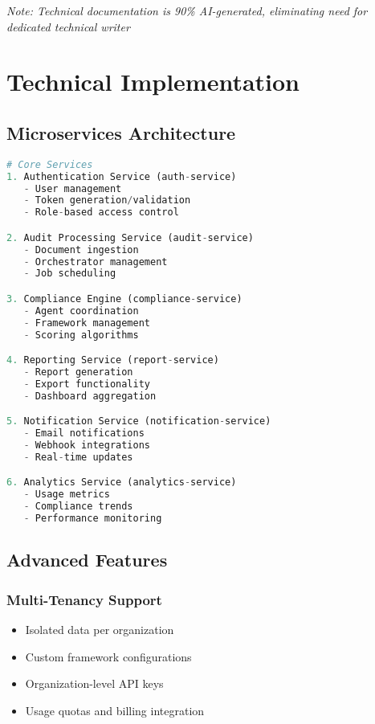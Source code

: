 \documentclass[12pt,a4paper]{report}
\begin{document}
\textit{Note: Technical documentation is 90\% AI-generated, eliminating need for dedicated technical writer}

\section{Technical Implementation}

\subsection{Microservices Architecture}

\begin{lstlisting}[language=Python, caption=Service Decomposition]
# Core Services
1. Authentication Service (auth-service)
   - User management
   - Token generation/validation
   - Role-based access control

2. Audit Processing Service (audit-service)
   - Document ingestion
   - Orchestrator management
   - Job scheduling

3. Compliance Engine (compliance-service)
   - Agent coordination
   - Framework management
   - Scoring algorithms

4. Reporting Service (report-service)
   - Report generation
   - Export functionality
   - Dashboard aggregation

5. Notification Service (notification-service)
   - Email notifications
   - Webhook integrations
   - Real-time updates

6. Analytics Service (analytics-service)
   - Usage metrics
   - Compliance trends
   - Performance monitoring
\end{lstlisting}

\subsection{Advanced Features}

\subsubsection{Multi-Tenancy Support}
\begin{itemize}
    \item Isolated data per organization
    \item Custom framework configurations
    \item Organization-level API keys
    \item Usage quotas and billing integration
\end{itemize}
\end{document}

